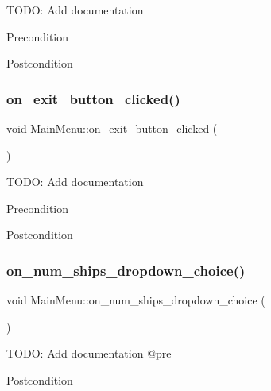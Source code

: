 T\+O\+DO\+: Add documentation \begin{DoxyPrecond}{Precondition}

\end{DoxyPrecond}
\begin{DoxyPostcond}{Postcondition}

\end{DoxyPostcond}
\mbox{\label{classMainMenu_a9b9f6812f90946e135022cf5826d8eed}} 
\subsubsection{\texorpdfstring{on\_exit\_button\_clicked()}{on\_exit\_button\_clicked()}}
{\footnotesize\ttfamily void Main\+Menu\+::on\+\_\+exit\+\_\+button\+\_\+clicked (\begin{DoxyParamCaption}{ }\end{DoxyParamCaption})\hspace{0.3cm}{\ttfamily [protected]}}

T\+O\+DO\+: Add documentation \begin{DoxyPrecond}{Precondition}

\end{DoxyPrecond}
\begin{DoxyPostcond}{Postcondition}

\end{DoxyPostcond}
\mbox{\label{classMainMenu_abf942855bc24b2446fa96966fe7e8a39}} 
\subsubsection{\texorpdfstring{on\_num\_ships\_dropdown\_choice()}{on\_num\_ships\_dropdown\_choice()}}
{\footnotesize\ttfamily void Main\+Menu\+::on\+\_\+num\+\_\+ships\+\_\+dropdown\+\_\+choice (\begin{DoxyParamCaption}{ }\end{DoxyParamCaption})\hspace{0.3cm}{\ttfamily [protected]}}

T\+O\+DO\+: Add documentation @pre \begin{DoxyPostcond}{Postcondition}

\end{DoxyPostcond}
\mbox{\label{classMainMenu_a4c0bad31b1bbd49b3e8351ca137d4ac0}} 
